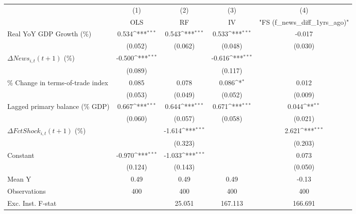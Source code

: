 {
\def\sym#1{\ifmmode^{#1}\else\(^{#1}\)\fi}
\begin{tabular}{l*{4}{c}}
\toprule
                    &\multicolumn{1}{c}{(1)}&\multicolumn{1}{c}{(2)}&\multicolumn{1}{c}{(3)}&\multicolumn{1}{c}{(4)}\\
                    &\multicolumn{1}{c}{OLS}&\multicolumn{1}{c}{RF}&\multicolumn{1}{c}{IV}&\multicolumn{1}{c}{ "FS (f_news_diff_1yrs_ago)" }\\
\midrule
Real YoY GDP Growth (\%)&       0.534\sym{***}&       0.543\sym{***}&       0.533\sym{***}&      -0.017         \\
                    &     (0.052)         &     (0.062)         &     (0.048)         &     (0.030)         \\
\addlinespace
$ \Delta News_{i,t}(t+1)$ (\%)&      -0.500\sym{***}&                     &      -0.616\sym{***}&                     \\
                    &     (0.089)         &                     &     (0.117)         &                     \\
\addlinespace
\% Change in terms-of-trade index&       0.085         &       0.078         &       0.086\sym{*}  &       0.012         \\
                    &     (0.053)         &     (0.049)         &     (0.052)         &     (0.009)         \\
\addlinespace
Lagged primary balance (\% GDP)&       0.667\sym{***}&       0.644\sym{***}&       0.671\sym{***}&       0.044\sym{**} \\
                    &     (0.060)         &     (0.057)         &     (0.058)         &     (0.021)         \\
\addlinespace
$ \Delta FctShock_{i,t}(t+1)$ (\%)&                     &      -1.614\sym{***}&                     &       2.621\sym{***}\\
                    &                     &     (0.323)         &                     &     (0.203)         \\
\addlinespace
Constant            &      -0.970\sym{***}&      -1.033\sym{***}&                     &       0.073         \\
                    &     (0.124)         &     (0.143)         &                     &     (0.050)         \\
\midrule
Mean Y              &        0.49         &        0.49         &        0.49         &       -0.13         \\
Observations        &         400         &         400         &         400         &         400         \\
Exc. Inst. F-stat   &                     &      25.051         &     167.113         &     166.691         \\
\bottomrule
\end{tabular}
}
